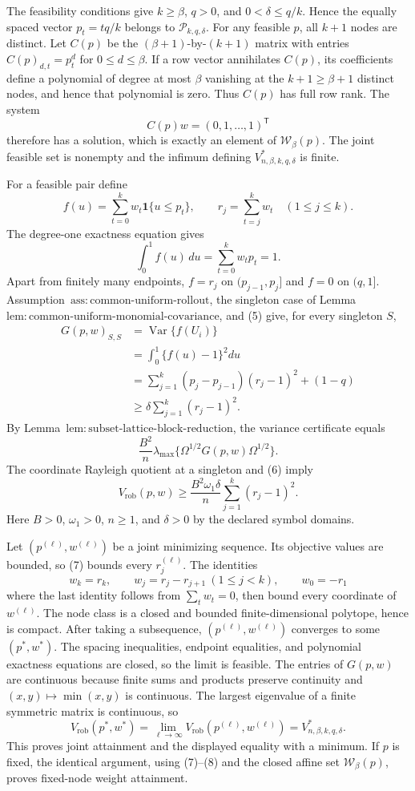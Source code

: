 The feasibility conditions give \(k\ge\beta\), \(q>0\), and \(0<\delta\le q/k\).  Hence the equally spaced vector \(p_t=tq/k\) belongs to \(\mathcal P_{k,q,\delta}\).  For any feasible \(p\), all \(k+1\) nodes are distinct.  Let \(C(p)\) be the \((\beta+1)\)-by-\((k+1)\) matrix with entries \(C(p)_{d,t}=p_t^d\) for \(0\le d\le\beta\).  If a row vector annihilates \(C(p)\), its coefficients define a polynomial of degree at most \(\beta\) vanishing at the \(k+1\ge\beta+1\) distinct nodes, and hence that polynomial is zero.  Thus \(C(p)\) has full row rank.  The system
\[
C(p)w=(0,1,\ldots,1)^{\mathsf T}
\]
therefore has a solution, which is exactly an element of \(\mathcal W_\beta(p)\).  The joint feasible set is nonempty and the infimum defining \(V^*_{n,\beta,k,q,\delta}\) is finite.

For a feasible pair define
\[
f(u)=\sum_{t=0}^kw_t\mathbf 1\{u\le p_t\},
\qquad
r_j=\sum_{t=j}^kw_t\quad(1\le j\le k).
\]
The degree-one exactness equation gives
\[
\int_0^1f(u)\,du=\sum_{t=0}^kw_tp_t=1.
\tag{5}
\]
Apart from finitely many endpoints, \(f=r_j\) on \((p_{j-1},p_j]\) and \(f=0\) on \((q,1]\).  Assumption~\(\mathrm{ass{:}common\text{-}uniform\text{-}rollout}\), the singleton case of Lemma~\(\mathrm{lem{:}common\text{-}uniform\text{-}monomial\text{-}covariance}\), and (5) give, for every singleton \(S\),
\[
\begin{aligned}
G(p,w)_{S,S}
&=\operatorname{Var}\{f(U_i)\}\\
&=\int_0^1\{f(u)-1\}^2du\\
&=\sum_{j=1}^k(p_j-p_{j-1})(r_j-1)^2+(1-q)\\
&\ge\delta\sum_{j=1}^k(r_j-1)^2.
\end{aligned}
\tag{6}
\]
By Lemma~\(\mathrm{lem{:}subset\text{-}lattice\text{-}block\text{-}reduction}\), the variance certificate equals
\[
\frac{B^2}{n}\lambda_{\max}\{\Omega^{1/2}G(p,w)\Omega^{1/2}\}.
\]
The coordinate Rayleigh quotient at a singleton and (6) imply
\[
V_{\mathrm{rob}}(p,w)
\ge\frac{B^2\omega_1\delta}{n}
\sum_{j=1}^k(r_j-1)^2.
\tag{7}
\]
Here \(B>0\), \(\omega_1>0\), \(n\ge1\), and \(\delta>0\) by the declared symbol domains.

Let \((p^{(\ell)},w^{(\ell)})\) be a joint minimizing sequence.  Its objective values are bounded, so (7) bounds every \(r_j^{(\ell)}\).  The identities
\[
w_k=r_k,\qquad
w_j=r_j-r_{j+1}\ (1\le j<k),\qquad
w_0=-r_1
\tag{8}
\]
where the last identity follows from \(\sum_tw_t=0\), then bound every coordinate of \(w^{(\ell)}\).  The node class is a closed and bounded finite-dimensional polytope, hence is compact.  After taking a subsequence, \((p^{(\ell)},w^{(\ell)})\) converges to some \((p^*,w^*)\).  The spacing inequalities, endpoint equalities, and polynomial exactness equations are closed, so the limit is feasible.  The entries of \(G(p,w)\) are continuous because finite sums and products preserve continuity and \((x,y)\mapsto\min(x,y)\) is continuous.  The largest eigenvalue of a finite symmetric matrix is continuous, so
\[
V_{\mathrm{rob}}(p^*,w^*)
=\lim_{\ell\to\infty}V_{\mathrm{rob}}(p^{(\ell)},w^{(\ell)})
=V^*_{n,\beta,k,q,\delta}.
\]
This proves joint attainment and the displayed equality with a minimum.  If \(p\) is fixed, the identical argument, using (7)--(8) and the closed affine set \(\mathcal W_\beta(p)\), proves fixed-node weight attainment.